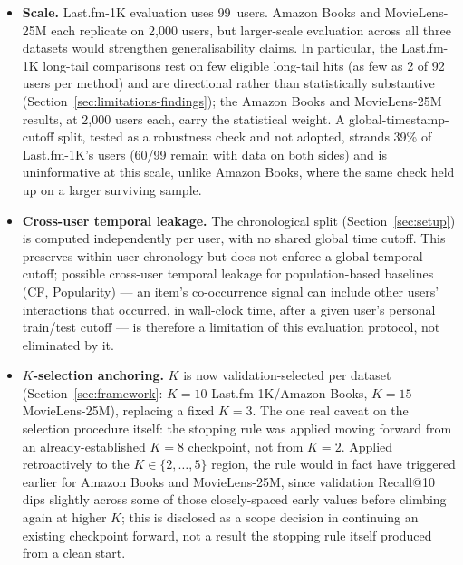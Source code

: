 \documentclass[11pt,a4paper]{article}
\begin{document}
\begin{itemize}[leftmargin=*, itemsep=3pt]
  \item \textbf{Scale.} Last.fm-1K evaluation uses 99~users. Amazon Books
        and MovieLens-25M each replicate on 2{,}000 users, but larger-scale
        evaluation across all three datasets would strengthen
        generalisability claims. In particular, the Last.fm-1K long-tail
        comparisons rest on few eligible long-tail hits (as few as 2 of 92
        users per method) and are directional rather than statistically
        substantive (Section~\ref{sec:limitations-findings}); the Amazon
        Books and MovieLens-25M results, at 2{,}000 users each, carry the
        statistical weight. A global-timestamp-cutoff split, tested as a
        robustness check and not adopted, strands 39\% of Last.fm-1K's
        users (60/99 remain with data on both sides) and is uninformative
        at this scale, unlike Amazon Books, where the same check held up
        on a larger surviving sample.
  \item \textbf{Cross-user temporal leakage.} The chronological split
        (Section~\ref{sec:setup}) is computed independently per user, with
        no shared global time cutoff. This preserves within-user
        chronology but does not enforce a global temporal cutoff; possible
        cross-user temporal leakage for population-based baselines (CF,
        Popularity) --- an item's co-occurrence signal can include other
        users' interactions that occurred, in wall-clock time, after a
        given user's personal train/test cutoff --- is therefore a
        limitation of this evaluation protocol, not eliminated by it.
  \item \textbf{$K$-selection anchoring.} $K$ is now validation-selected
        per dataset (Section~\ref{sec:framework}: $K=10$ Last.fm-1K/Amazon
        Books, $K=15$ MovieLens-25M), replacing a fixed $K=3$. The one real
        caveat on the selection procedure itself: the stopping rule was
        applied moving forward from an already-established $K=8$
        checkpoint, not from $K=2$. Applied retroactively to the
        $K\in\{2,\ldots,5\}$ region, the rule would in fact have triggered
        earlier for Amazon Books and MovieLens-25M, since validation
        Recall@10 dips slightly across some of those closely-spaced early
        values before climbing again at higher $K$; this is disclosed as a
        scope decision in continuing an existing checkpoint forward, not a
        result the stopping rule itself produced from a clean start.

\end{itemize}
\end{document}
